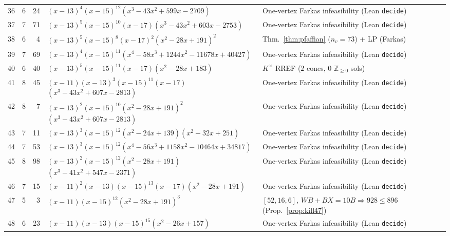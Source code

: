 \documentclass[11pt,reqno]{amsart}
\theoremstyle{definition}
\theoremstyle{remark}
\numberwithin{equation}{section}
\numberwithin{table}{section}
\begin{document}
{\begin{longtable}{@{}rrr>{\raggedright\arraybackslash}p{2.50in}>{\raggedright\arraybackslash}p{2.30in}@{}}
36 & 6 & 24 & $(x-13)^4$\allowbreak $(x-15)^{12}$\allowbreak $(x^3-43x^2+599x-2709)$ & One-vertex Farkas infeasibility (Lean \texttt{decide}) \\
37 & 7 & 71 & $(x-13)^5$\allowbreak $(x-15)^{10}$\allowbreak $(x-17)$\allowbreak $(x^3-43x^2+603x-2753)$ & One-vertex Farkas infeasibility (Lean \texttt{decide}) \\
38 & 6 & 4 & $(x-13)^5$\allowbreak $(x-15)^8$\allowbreak $(x-17)^2$\allowbreak $(x^2-28x+191)^2$ & Thm.~\ref{thm:pfaffian} ($n_v=73$) + LP (Farkas) \\
39 & 7 & 69 & $(x-13)^4$\allowbreak $(x-15)^{11}$\allowbreak $(x^4-58x^3+1244x^2-11678x+40427)$ & One-vertex Farkas infeasibility (Lean \texttt{decide}) \\
40 & 6 & 40 & $(x-13)^5$\allowbreak $(x-15)^{11}$\allowbreak $(x-17)$\allowbreak $(x^2-28x+183)$ & $K^\times$ RREF ($2$ cones, $0$ $\mathbb{Z}_{\ge 0}$ sols) \\
41 & 8 & 45 & $(x-11)$\allowbreak $(x-13)^3$\allowbreak $(x-15)^{11}$\allowbreak $(x-17)$\allowbreak $(x^3-43x^2+607x-2813)$ & One-vertex Farkas infeasibility (Lean \texttt{decide}) \\
42 & 8 & 7 & $(x-13)^2$\allowbreak $(x-15)^{10}$\allowbreak $(x^2-28x+191)^2$\allowbreak $(x^3-43x^2+607x-2813)$ & One-vertex Farkas infeasibility (Lean \texttt{decide}) \\
43 & 7 & 11 & $(x-13)^3$\allowbreak $(x-15)^{12}$\allowbreak $(x^2-24x+139)$\allowbreak $(x^2-32x+251)$ & One-vertex Farkas infeasibility (Lean \texttt{decide}) \\
44 & 7 & 53 & $(x-13)^3$\allowbreak $(x-15)^{12}$\allowbreak $(x^4-56x^3+1158x^2-10464x+34817)$ & One-vertex Farkas infeasibility (Lean \texttt{decide}) \\
45 & 8 & 98 & $(x-13)^2$\allowbreak $(x-15)^{12}$\allowbreak $(x^2-28x+191)$\allowbreak $(x^3-41x^2+547x-2371)$ & One-vertex Farkas infeasibility (Lean \texttt{decide}) \\
46 & 7 & 15 & $(x-11)^2$\allowbreak $(x-13)$\allowbreak $(x-15)^{13}$\allowbreak $(x-17)$\allowbreak $(x^2-28x+191)$ & One-vertex Farkas infeasibility (Lean \texttt{decide}) \\
47 & 5 & 3 & $(x-11)$\allowbreak $(x-15)^{12}$\allowbreak $(x^2-28x+191)^3$ & $[52,16,6]$, $WB+BX=10B \Rightarrow 928\le 896$ (Prop.~\ref{prop:kill47}) \\
48 & 6 & 23 & $(x-11)$\allowbreak $(x-13)$\allowbreak $(x-15)^{15}$\allowbreak $(x^2-26x+157)$ & One-vertex Farkas infeasibility (Lean \texttt{decide}) \\

\end{longtable}}
\end{document}
